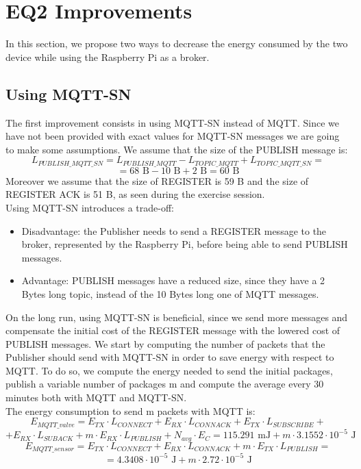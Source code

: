 \section{EQ2 Improvements}
In this section, we propose two ways to decrease the energy consumed by the two device while using the Raspberry Pi as a broker. 

\subsection{Using MQTT-SN}
The first improvement consists in using MQTT-SN instead of MQTT. Since we have not been provided with exact values for MQTT-SN messages we are going to make some assumptions. We assume that the size of the PUBLISH message is:
\[L_{PUBLISH\_MQTT\_SN} = L_{PUBLISH\_MQTT} - L_{TOPIC\_MQTT} + L_{TOPIC\_MQTT\_SN}  =\]
\[= 68 \text{ B} - 10 \text{ B} + 2 \text{ B} = 60 \text{ B} \]
Moreover we assume that the size of REGISTER is 59 B and the size of REGISTER ACK is 51 B, as seen during the exercise session.\\
Using MQTT-SN introduces a trade-off: 
\begin{itemize}
	\item Disadvantage: the Publisher needs to send a REGISTER message to the broker, represented by the Raspberry Pi, before being able to send PUBLISH messages.
	\item Advantage: PUBLISH messages have a reduced size, since they have a 2 Bytes long topic, instead of the 10 Bytes long one of MQTT messages.
\end{itemize}
On the long run, using MQTT-SN is beneficial, since we send more messages and compensate the initial cost of the REGISTER message with the lowered cost of PUBLISH messages. We start by computing the number of packets that the Publisher should send with MQTT-SN in order to save energy with respect to MQTT. To do so, we compute the energy needed to send the initial packages, publish a variable number of packages m and compute the average every 30 minutes both with MQTT and MQTT-SN.\\
The energy consumption to send m packets with MQTT is:
\[E_{MQTT\_valve} = E_{TX} \cdot L_{CONNECT} + E_{RX} \cdot L_{CONNACK} + E_{TX} \cdot L_{SUBSCRIBE} +\]
\[+ E_{RX} \cdot L_{SUBACK} + m \cdot E_{RX} \cdot L_{PUBLISH} + N_{avg} \cdot E_{C} = 115.291 \text{ mJ} + m \cdot 3.1552 \cdot 10^{-5} \text{ J}\]
\[E_{MQTT\_sensor} = E_{TX} \cdot L_{CONNECT} + E_{RX} \cdot L_{CONNACK} + m \cdot E_{TX} \cdot L_{PUBLISH} =\]
\[= 4.3408 \cdot 10^{-5} \text{ J} + m \cdot 2.72 \cdot 10^{-5} \text{ J}\]

